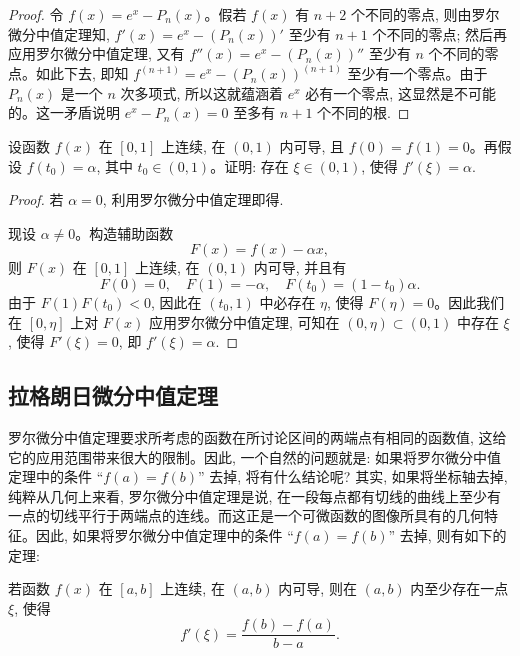 \begin{proof}
令 $f(x)=e^x-P_n(x)$。假若 $f(x)$ 有 $n+2$ 个不同的零点, 则由罗尔微分中值定理知, $f'(x)=e^x-(P_n(x))'$ 至少有 $n+1$ 个不同的零点; 然后再应用罗尔微分中值定理, 又有 $f''(x)=e^x-(P_n(x))''$ 至少有 $n$ 个不同的零点。如此下去, 即知 $f^{(n+1)}=e^x-(P_n(x))^{(n+1)}$ 至少有一个零点。由于 $P_n(x)$ 是一个 $n$ 次多项式, 所以这就蕴涵着 $e^x$ 必有一个零点, 这显然是不可能的。这一矛盾说明 $e^x-P_n(x)=0$ 至多有 $n+1$ 个不同的根.
\end{proof}


\begin{example}\label{example:ma-5-1-3}
设函数 $f(x)$ 在 $[0,1]$ 上连续, 在 $(0,1)$ 内可导, 且 $f(0)=f(1)=0$。再假设 $f(t_0)=\alpha$, 其中 $t_0\in(0,1)$。证明: 存在 $\xi\in(0,1)$, 使得 $f'(\xi)=\alpha$.
\end{example}


\begin{proof}
若 $\alpha=0$, 利用罗尔微分中值定理即得.

现设 $\alpha\ne0$。构造辅助函数
\[
  F(x)=f(x)-\alpha x,
\]
则 $F(x)$ 在 $[0,1]$ 上连续, 在 $(0,1)$ 内可导, 并且有
\[
  F(0)=0,\quad F(1)=-\alpha,\quad F(t_0)=(1-t_0)\alpha.
\]
由于 $F(1)F(t_0)<0$, 因此在 $(t_0,1)$ 中必存在 $\eta$, 使得 $F(\eta)=0$。因此我们在 $[0,\eta]$ 上对 $F(x)$ 应用罗尔微分中值定理, 可知在 $(0,\eta)\subset(0,1)$ 中存在 $\xi$, 使得 $F'(\xi)=0$, 即 $f'(\xi)=\alpha$.
\end{proof}


\subsection{拉格朗日微分中值定理}
\label{subsec:ma-5-1-3}

罗尔微分中值定理要求所考虑的函数在所讨论区间的两端点有相同的函数值, 这给它的应用范围带来很大的限制。因此, 一个自然的问题就是: 如果将罗尔微分中值定理中的条件 ``$f(a)=f(b)$'' 去掉, 将有什么结论呢? 其实, 如果将坐标轴去掉, 纯粹从几何上来看, 罗尔微分中值定理是说, 在一段每点都有切线的曲线上至少有一点的切线平行于两端点的连线。而这正是一个可微函数的图像所具有的几何特征。因此, 如果将罗尔微分中值定理中的条件 ``$f(a)=f(b)$'' 去掉, 则有如下的定理:

\begin{theorem}\label{theorem:ma-5-1-3}
若函数 $f(x)$ 在 $[a,b]$ 上连续, 在 $(a,b)$ 内可导, 则在 $(a,b)$ 内至少存在一点 $\xi$, 使得
\begin{equation}
  f'(\xi)=\frac{f(b)-f(a)}{b-a}.
  \label{eq:ma-5-1-1}
\end{equation}
\end{theorem}



